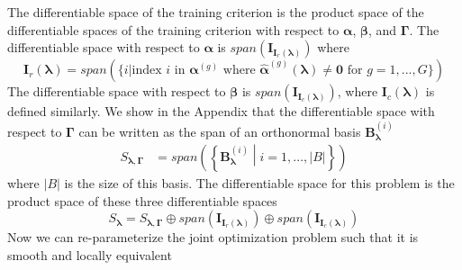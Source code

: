 \documentclass[12pt]{article}
\begin{document}
The differentiable space of the training criterion is the product space of the differentiable spaces of the training criterion with respect to $\boldsymbol{\alpha}$, $\boldsymbol{\beta}$, and $\boldsymbol{\Gamma}$. The differentiable space with respect to $\boldsymbol{\alpha}$ is  $span(\boldsymbol{I}_{\boldsymbol{I}_r(\boldsymbol\lambda)})$ where
$$
\boldsymbol{I}_r(\boldsymbol\lambda)
= 
span(\{
i | \text{index } i \text{ in } \boldsymbol{\alpha}^{(g)} \text{ where }
\hat{\boldsymbol{\alpha}}^{(g)}(\boldsymbol{\lambda}) \ne \boldsymbol{0} \text{ for } g=1,...,G
\})
$$ 
The differentiable space with respect to $\boldsymbol{\beta}$ is $span(\boldsymbol{I}_{\boldsymbol{I}_c(\boldsymbol\lambda)})$, where $\boldsymbol{I}_c(\boldsymbol\lambda)$ is defined similarly. We show in the Appendix that the differentiable space with respect to $\boldsymbol{\Gamma}$ can be written as the span of an orthonormal basis $\boldsymbol{B}_{\boldsymbol{\lambda}}^{(i)}$
\begin{align}
S_{\boldsymbol \lambda, \boldsymbol{\Gamma}} 
 & = span \left (\left \{
\boldsymbol{B}^{(i)}_{\boldsymbol{\lambda}}
\middle | 
i=1,...,|B|
\right \} \right )
\label{eq:nuclear_norm_diff_space}
\end{align}
where $|B|$ is the size of this basis.
The differentiable space for this problem is the product space of these three differentiable spaces
\begin{equation}
S_{\boldsymbol \lambda} 
= 
S_{\boldsymbol \lambda, \boldsymbol{\Gamma}} 
\oplus span(\boldsymbol{I}_{\boldsymbol{I}_r(\boldsymbol\lambda)})
\oplus span(\boldsymbol{I}_{\boldsymbol{I}_c(\boldsymbol\lambda)})
\label{eq:matrix_completion_diff_space}
\end{equation}
Now we can re-parameterize the joint optimization problem such that it is smooth and locally equivalent
\end{document}
